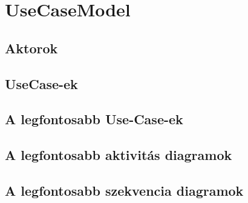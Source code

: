 \chapter{UseCaseModel}\label{sect:UseCaseModel}
\section{Aktorok}

\section{UseCase-ek}

\section{A legfontosabb Use-Case-ek}

\section{A legfontosabb aktivitás diagramok}

\section{A legfontosabb szekvencia diagramok}
